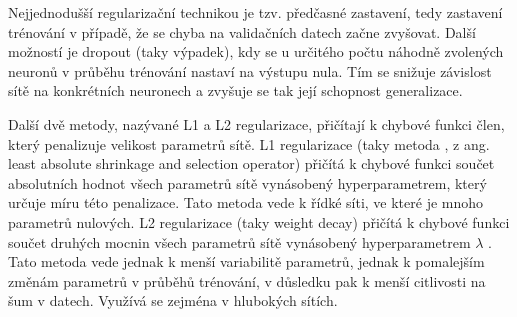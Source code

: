 Nejjednodušší regularizační technikou je tzv. předčasné zastavení, tedy
zastavení trénování v případě, že se chyba na validačních datech začne
zvyšovat. Další možností je dropout (taky výpadek), kdy se u určitého počtu
náhodně zvolených neuronů v průběhu trénování nastaví na výstupu nula. Tím se
snižuje závislost sítě na konkrétních neuronech a zvyšuje se tak její schopnost
generalizace.

Další dvě metody, nazývané L1 a L2 regularizace, přičítají k chybové funkci
člen, který penalizuje velikost parametrů sítě. L1 regularizace (taky metoda
\cite{lasso}, z ang. least absolute shrinkage and selection operator) přičítá k
chybové funkci součet absolutních hodnot všech parametrů sítě vynásobený
hyperparametrem, který určuje míru této penalizace. Tato metoda vede k řídké
síti, ve které je mnoho parametrů nulových. L2 regularizace (taky weight decay)
přičítá k chybové funkci součet druhých mocnin všech parametrů sítě vynásobený
hyperparametrem $\lambda$ \cite{l2}. Tato metoda vede jednak k menší
variabilitě parametrů, jednak k pomalejším změnám parametrů v průběhů
trénování, v důsledku pak k menší citlivosti na šum v datech. Využívá se
zejména v hlubokých sítích.

\endinput